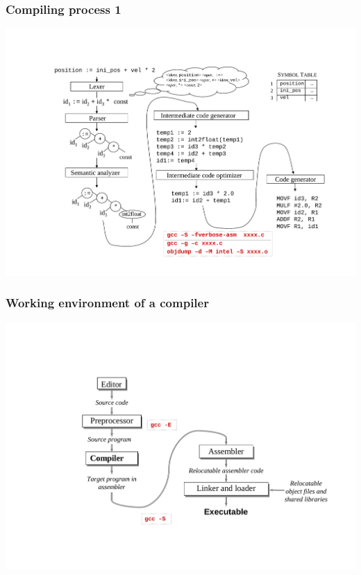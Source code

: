 \documentclass{beamer}
\begin{document}
\begin{frame}
\frametitle{Compiling process 1}
\begin{center}
\includegraphics[scale=0.48]{5}
\end{center}
\end{frame}


\begin{frame}
\frametitle{Working environment of a compiler}
\begin{center}
\includegraphics[scale=0.5]{4}
\end{center}
\end{frame}
\end{document}
